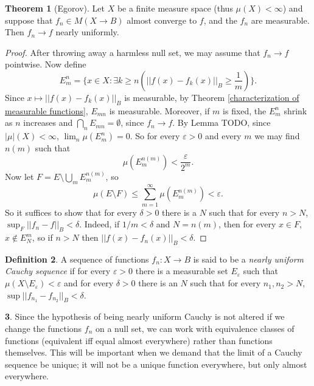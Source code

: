 \documentclass[12pt]{book}
\newcommand{\dfn}[1]{\emph{#1}\index{#1}}
\theoremstyle{definition}
\newtheorem{theorem}{Theorem}[section]
\newtheorem{subsec}[theorem]{}
\newtheorem{definition}[theorem]{Definition}
\begin{document}
\begin{theorem}[Egorov]
Let $X$ be a finite measure space (thus $\mu(X) < \infty$) and suppose that $f_n \in M(X \to B)$ almost converge to $f$, and the $f_n$ are measurable.
Then $f_n \to f$ nearly uniformly.
\end{theorem}
\begin{proof}
After throwing away a harmless null set, we may assume that $f_n \to f$ pointwise. Now define
$$E_m^n = \{x \in X: \exists k \geq n(||f(x) - f_k(x)||_B \geq \frac{1}{m})\}.$$
Since $x \mapsto ||f(x) - f_k(x)||_B$ is measurable, by Theorem \ref{characterization of measurable functions}, $E_{mn}$ is measurable.
Moreover, if $m$ is fixed, the $E_m^n$ shrink as $n$ increases and $\bigcap_n E_{mn} = \emptyset$, since $f_n \to f$.
By Lemma TODO, since $|\mu|(X) < \infty$, $\lim_n \mu(E_m^n) = 0$. So for every $\varepsilon > 0$ and every $m$ we may find $n(m)$ such that
$$\mu(E_m^{n(m)}) < \frac{\varepsilon}{2^m}.$$
Now let $F = E \setminus \bigcup_m E_m^{n(m)}$, so
$$\mu(E \setminus F) \leq \sum_{m=1}^\infty \mu(E_m^{n(m)}) < \varepsilon.$$
So it suffices to show that for every $\delta > 0$ there is a $N$ such that for every $n > N$, $\sup_F ||f_n - f||_B < \delta$.
Indeed, if $1/m < \delta$ and $N = n(m)$, then for every $x \in F$, $x \notin E_N^m$, so if $n > N$ then $||f(x) - f_n(x)||_B < \delta$.
\end{proof}

\begin{definition}
A sequence of functions $f_n: X \to B$ is said to be a \dfn{nearly uniform Cauchy sequence} if for every $\varepsilon > 0$ there is a measurable set $E_\varepsilon$ such that $\mu(X \setminus E_\varepsilon) < \varepsilon$ and for every $\delta > 0$ there is an $N$ such that for every $n_1, n_2 > N$, $\sup ||f_{n_1} - f_{n_2}||_B < \delta$.
\end{definition}

\begin{subsec}
Since the hypothesis of being nearly uniform Cauchy is not altered if we change the functions $f_n$ on a null set, we can work with equivalence classes of functions (equivalent iff equal almost everywhere) rather than functions themselves. This will be important when we demand that the limit of a Cauchy sequence be unique; it will not be a unique function everywhere, but only almost everywhere.
\end{subsec}
\end{document}
